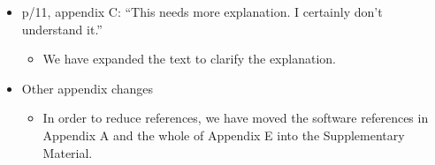 \documentclass[a4paper, 10pt]{letter}
\begin{document}
\begin{itemize}
\item p/11, appendix C: ``This needs more explanation. I certainly don't understand it.''
\begin{itemize}
\item We have expanded the text to clarify the explanation. 
\end{itemize}

\item Other appendix changes
\begin{itemize}
\item In order to reduce references, we have moved the software references in Appendix A and the whole of Appendix E into the Supplementary Material. 
\end{itemize}

\end{itemize}
\end{document}
